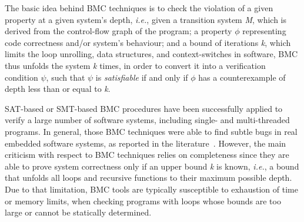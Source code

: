 \documentclass{acm_sen_article}
\begin{document}
The basic idea behind BMC techniques is to check the violation of a given property at a given system's depth, {\it i.e.}, given a transition system \textit{M}, which is derived from the control-flow graph of the program; a property $\phi$ representing code correctness and/or system's behaviour; and a bound of iterations \textit{k}, which limits the loop unrolling, data structures, and context-switches in software, BMC thus unfolds the system \textit{k} times, in order to convert it into a verification condition $\psi$, such that $\psi$ is \textit{satisfiable} if and only if $\phi$ has a counterexample of depth less than or equal to \textit{k}.

SAT-based or SMT-based BMC procedures have been successfully applied to verify a large number of software systems, including single- and multi-threaded programs. In general, those BMC techniques were able to find subtle bugs in real embedded software systems, as reported in the literature~\cite{Clarke04,MerzFS12,CordeiroF11,Ivancic05,Cordeiro12}. However, the main criticism with respect to BMC techniques relies on completeness since they are able to prove system correctness only if an upper bound \textit{k} is known, {\it i.e.}, a bound that unfolds all loops and recursive functions to their maximum possible depth. Due to that limitation, BMC tools are typically susceptible to exhaustion of time or memory limits, when checking programs with loops whose bounds are too large or cannot be statically determined.  

\end{document}
